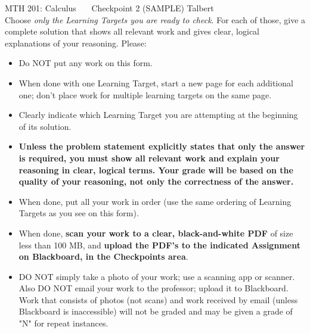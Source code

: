 \documentclass[11 pt]{article}
\begin{document}
\noindent MTH 201: Calculus \ \ \ Checkpoint 2 (SAMPLE) \hfill Talbert \\

 Choose \emph{only the Learning Targets you are ready to check}. For each of those, give a complete solution that shows all relevant work and gives clear, logical explanations of your reasoning. Please: 

\begin{itemize}
    \item Do NOT put any work on this form. 
    \item When done with one Learning Target, start a new page for each additional one; don't place work for multiple learning targets on the same page. 
    \item Clearly indicate which Learning Target you are attempting at the beginning of its solution. 
    \item \textbf{Unless the problem statement explicitly states that only the answer is required, you must show all relevant work and explain your reasoning in clear, logical terms. Your grade will be based on the quality of your reasoning, not only the correctness of the answer.}
    \item When done, put all your work in order (use the same ordering of Learning Targets as you see on this form). 
    \item When done, \textbf{scan your work to a clear, black-and-white PDF} of size less than 100 MB, and \textbf{upload the PDF's to the indicated Assignment on Blackboard, in the Checkpoints area}. 
    \item DO NOT simply take a photo of your work; use a scanning app or scanner. Also DO NOT email your work to the professor; upload it to Blackboard. Work that consists of photos (not scans) and work received by email (unless Blackboard is inaccessible) will not be graded and may be given a grade of "N" for repeat instances. 
\end{itemize}

\noindent \hrulefill
\end{document}
